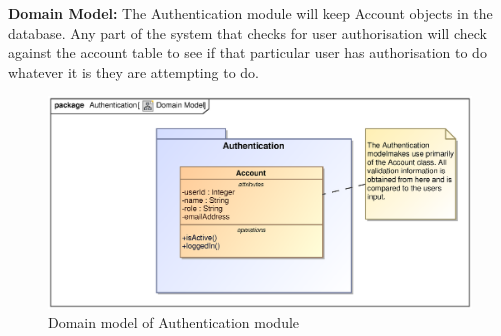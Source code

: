 \newpage
\textbf{Domain Model:} The Authentication module will keep Account objects in the database. Any part of the system that checks for user authorisation will check against the account table to see if that particular user has authorisation to do whatever it is they are attempting to do. 

\begin{figure}[h]
\includegraphics[scale=0.9]{epsImages/Authentication/domainModel.eps}
\caption{Domain model of Authentication module}
\end{figure}
